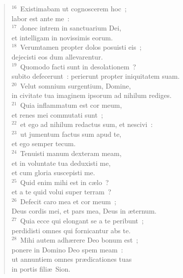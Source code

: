 \begin{flushleft}
\begin{verse}
${}^{16}$~Existimabam ut cognoscerem hoc~;\\ labor est ante me~:\\
${}^{17}$~donec intrem in sanctuarium Dei,\\ et intelligam in novissimis eorum.\\
${}^{18}$~Verumtamen propter dolos posuisti eis~;\\ dejecisti eos dum allevarentur.\\
${}^{19}$~Quomodo facti sunt in desolationem~?\\ subito defecerunt~: perierunt propter iniquitatem suam.\\
${}^{20}$~Velut somnium surgentium, Domine,\\ in civitate tua imaginem ipsorum ad nihilum rediges.\\
${}^{21}$~Quia inflammatum est cor meum,\\ et renes mei commutati sunt~;\\
${}^{22}$~et ego ad nihilum redactus sum, et nescivi~:\\
${}^{23}$~ut jumentum factus sum apud te,\\ et ego semper tecum.\\
${}^{24}$~Tenuisti manum dexteram meam,\\ et in voluntate tua deduxisti me,\\ et cum gloria suscepisti me.\\
${}^{25}$~Quid enim mihi est in c\ae lo~?\\ et a te quid volui super terram~?\\
${}^{26}$~Defecit caro mea et cor meum~;\\ Deus cordis mei, et pars mea, Deus in \ae ternum.\\
${}^{27}$~Quia ecce qui elongant se a te peribunt~;\\ perdidisti omnes qui fornicantur abs te.\\
${}^{28}$~Mihi autem adh\ae rere Deo bonum est~;\\ ponere in Domino Deo spem meam~:\\ ut annuntiem omnes pr\ae dicationes tuas\\ in portis fili\ae\ Sion.\end{verse}\end{flushleft}


